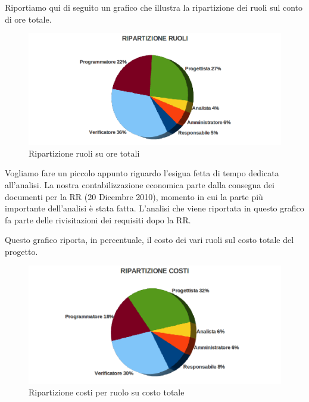 Riportiamo qui di seguito un grafico che illustra la ripartizione dei ruoli
sul conto di ore totale.\\

\vspace{0cm}
\begin{figure}[htbp]
  \centering
  \includegraphics[width=17.2cm, angle=0]{img/PP/RUOLI.png}
\caption{Ripartizione ruoli su ore totali}
\end{figure}

\vspace{0.8cm}
 
Vogliamo fare un piccolo appunto riguardo l'esigua fetta di tempo dedicata
all'analisi. La nostra contabilizzazione economica parte dalla consegna dei documenti per 
la RR (20 Dicembre 2010), momento in cui la parte pi\`u importante dell'analisi \`e stata fatta.
L'analisi che viene riportata in questo grafico fa parte delle
rivisitazioni dei requisiti dopo la RR.\\
\newpage

Questo grafico riporta, in percentuale, il costo dei vari ruoli sul costo totale
del progetto.

\vspace{0cm}
\begin{figure}[htbp]
  \centering
  \includegraphics[width=17.2cm, angle=0]{img/PP/COSTI.png}
\caption{Ripartizione costi per ruolo su costo totale}
\end{figure}
\vspace{0.5cm}

